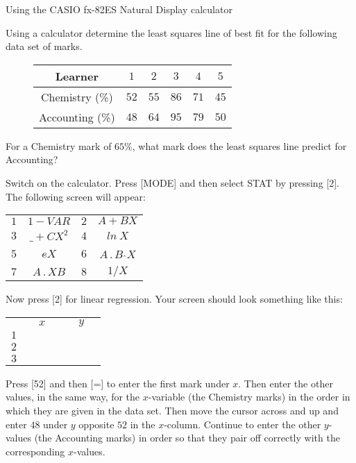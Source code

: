 \begin{wex}{Using the CASIO fx-82ES Natural Display calculator}{
Using a calculator determine the least squares line of best fit for the following data set of marks.
\begin{figure}[H]
\begin{tabular}{|c|c|c|c|c|c|}
\hline
Learner & $1$ & $2$ & $3$ & $4$ & $5$ \\ \hline
Chemistry (\%) & $52$ & $55$ & $86$ & $71$ & $45$ \\ \hline
Accounting (\%) & $48$ & $64$ & $95$ & $79$ & $50$ \\ \hline
\end{tabular}
\end{figure}
For a Chemistry mark of $65\%$, what mark does the least squares line predict for Accounting?}{
Switch on the calculator. Press [MODE] and then select STAT by pressing [2]. The following screen will appear:
\begin{center}
\begin{tabular}{|c c c c|}\hline
$1$ & $1-VAR$ & $2$ & $A + BX$ \\
$3$ & $\_ + CX^2$ & $4$ & $ln~X$ \\
$5$ & $e \hat{ } X$ & $6$ & $A \,.\, B$ $\hat{ } X$ \\
$7$ & $A \,.\, X \hat{ } B$ & $8$ & $1/X$ \\\hline
\end{tabular}
\end{center}
Now press [2] for linear regression. Your screen should look something like this:
\begin{center}
\begin{tabular}{c|c c c|c c c}
 & & $x$ & & & $y$ &\\
$1$& & & & & & \\
$2$& & & & & & \\
$3$& & & & & & \\
\end{tabular}
\end{center}

Press [52] and then [=] to enter the first mark under $x$. Then enter the other values, in the same way, for the $x$-variable (the Chemistry marks) in the order in which they are given in the data set. Then move the cursor across and up and enter $48$ under $y$ opposite $52$ in the $x$-column. Continue to enter the other $y$-values (the Accounting marks) in order so that they pair off correctly with the corresponding $x$-values.

}
\end{wex}
